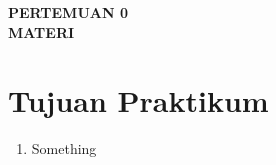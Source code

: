 \documentclass[a4paper,oneside,11pt]{book}
\newcommand{\Pertemuan}{0}
\newcommand{\Materi}{MATERI}
\begin{document}


\renewcommand{\cfttoctitlefont}{\hfill\normalfont\Large\bfseries}
\renewcommand{\cftaftertoctitle}{\hfill}
\renewcommand{\cftbeforetoctitleskip}{1em}
\renewcommand{\cftaftertoctitleskip}{1.5em}

\renewcommand{\cftchappresnum}{Bab~}
\renewcommand{\cftchapaftersnum}{.}
\renewcommand{\cftchapnumwidth}{3.5em}
\renewcommand{\cftchapfont}{\bfseries}
\renewcommand{\cftchappagefont}{\bfseries}

\setlength{\cftbeforechapskip}{0.8em} %
\setlength{\cftbeforesecskip}{0.2em}  %
\renewcommand{\cftsecfont}{\normalfont}
\renewcommand{\cftsubsecfont}{\normalfont}

\renewcommand{\contentsname}{\centering Daftar Isi}
\renewcommand{\listfigurename}{\centering Daftar Gambar}
\renewcommand{\lstlistlistingname}{\centering Daftar Kode}

\renewcommand{\cftloftitlefont}{\hfill\normalfont\LARGE\bfseries}
\renewcommand{\cftafterloftitle}{\hfill}

\tableofcontents

\newpage
\listoffigures

\newpage
\lstlistoflistings

\newpage
\begin{center}
  \textbf{
    \Large PERTEMUAN \Pertemuan\\
    {\Materi}
  }
\end{center}

\section{Tujuan Praktikum}
\begin{enumerate}
  \item Something
\end{enumerate}
\end{document}
